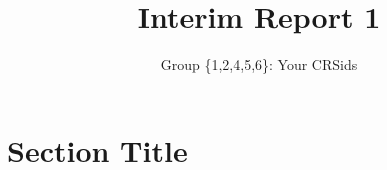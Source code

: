 \documentclass{article} %
\title{Interim Report 1}
\author{Group \{1,2,4,5,6\}: Your CRSids}
\begin{document}
\maketitle
\section{Section Title}
\end{document}
